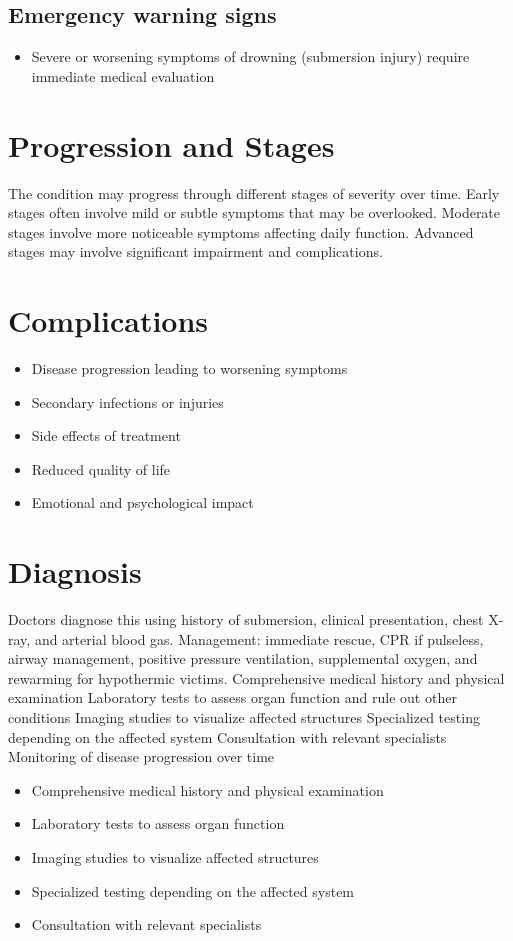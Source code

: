 \subsection{Emergency warning signs}
\begin{itemize}[noitemsep]
  \item Severe or worsening symptoms of drowning (submersion injury) require immediate medical evaluation
\end{itemize}
\section{Progression and Stages}
The condition may progress through different stages of severity over time. Early stages often involve mild or subtle symptoms that may be overlooked. Moderate stages involve more noticeable symptoms affecting daily function. Advanced stages may involve significant impairment and complications.
\section{Complications}
\begin{itemize}[noitemsep]
  \item Disease progression leading to worsening symptoms
  \item Secondary infections or injuries
  \item Side effects of treatment
  \item Reduced quality of life
  \item Emotional and psychological impact
\end{itemize}
\section{Diagnosis}
Doctors diagnose this using history of submersion, clinical presentation, chest X-ray, and arterial blood gas. Management: immediate rescue, CPR if pulseless, airway management, positive pressure ventilation, supplemental oxygen, and rewarming for hypothermic victims. Comprehensive medical history and physical examination Laboratory tests to assess organ function and rule out other conditions Imaging studies to visualize affected structures Specialized testing depending on the affected system Consultation with relevant specialists Monitoring of disease progression over time

\begin{itemize}[noitemsep]
  \item Comprehensive medical history and physical examination
  \item Laboratory tests to assess organ function
  \item Imaging studies to visualize affected structures
  \item Specialized testing depending on the affected system
  \item Consultation with relevant specialists
\end{itemize}
